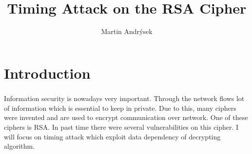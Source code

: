 \documentclass[thesis=B,english]{FITthesis}[2012/10/20]
\title{Timing Attack on the RSA Cipher}
\author{Martin Andr{\' y}sek} %
\begin{document}

\chapter{Introduction}

\paragraph*{}{
Information security is nowadays very important. Through the network flows lot of information which is essential to keep in private. Due to this, many ciphers were invented and are used to encrypt communication over network. One of these ciphers is RSA. In past time there were several vulnerabilities on this cipher. I will focus on timing attack which exploit data dependency of decrypting algorithm. 
}
\end{document}
